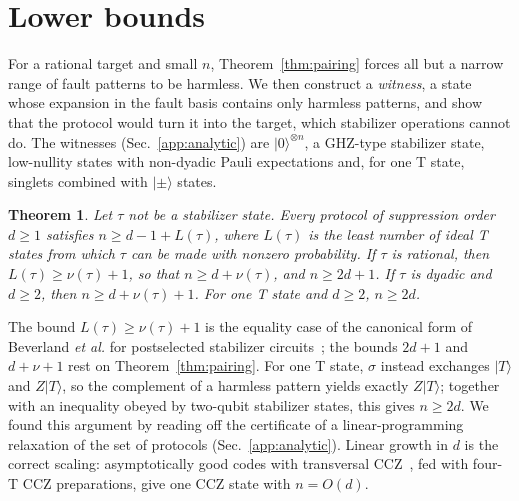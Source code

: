 \documentclass[aps,prl,reprint,twocolumn,amsmath,amssymb,floatfix,nofootinbib,superscriptaddress]{revtex4-2}
\newtheorem{theorem}{Theorem}
\begin{document}
\section{Lower bounds}\label{sec:lower}
For a rational target and small $n$, Theorem~\ref{thm:pairing} forces all but a narrow range of fault patterns to be harmless. We then construct a \emph{witness}, a state whose expansion in the fault basis contains only harmless patterns, and show that the protocol would turn it into the target, which stabilizer operations cannot do. The witnesses (Sec.~\ref{app:analytic}) are $|0\rangle^{\otimes n}$, a GHZ-type stabilizer state, low-nullity states with non-dyadic Pauli expectations and, for one T state, singlets combined with $|{\pm}\rangle$ states.
\begin{theorem}\label{thm:analytic}
Let $\tau$ not be a stabilizer state. Every protocol of suppression order $d\geq1$ satisfies $n\geq d-1+L(\tau)$, where $L(\tau)$ is the least number of ideal T states from which $\tau$ can be made with nonzero probability. If $\tau$ is rational, then $L(\tau)\geq\nu(\tau)+1$, so that $n\geq d+\nu(\tau)$, and $n\geq2d+1$. If $\tau$ is dyadic and $d\geq2$, then $n\geq d+\nu(\tau)+1$. For one T state and $d\geq2$, $n\geq2d$.
\end{theorem}
The bound $L(\tau)\geq\nu(\tau)+1$ is the equality case of the canonical form of Beverland \emph{et al.} for postselected stabilizer circuits~\cite{beverland}; the bounds $2d+1$ and $d+\nu+1$ rest on Theorem~\ref{thm:pairing}. For one T state, $\sigma$ instead exchanges $|T\rangle$ and $Z|T\rangle$, so the complement of a harmless pattern yields exactly $Z|T\rangle$; together with an inequality obeyed by two-qubit stabilizer states, this gives $n\geq2d$. We found this argument by reading off the certificate of a linear-programming relaxation of the set of protocols (Sec.~\ref{app:analytic}). Linear growth in $d$ is the correct scaling: asymptotically good codes with transversal CCZ~\cite{golowich,nguyen,whyamasaki}, fed with four-T CCZ preparations, give one CCZ state with $n=O(d)$.
\end{document}
